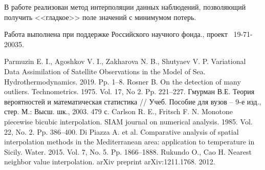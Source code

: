   

В работе реализован метод интерполяции данных наблюдений, позволяющий получить <<гладкое>> поле значений с минимумом потерь.
 
Работа выполнена при поддержке Российского научного фонда., проект \textnumero~19-71-20035.
 



\begin{thebibliography}{9} %
 Parmuzin  E. I., Agoshkov  V. I.,  Zakharova  N. B., Shutyaev  V. P. Variational Data Assimilation of Satellite Observations in the Model of Sea. Hydrothermodynamics. 2019. Pp. 1--8. 
 Rosner  B. On the detection of many outliers. Technometrics. 1975. Vol. 17, No 2. Pp. 221--227.
 Гмурман В.Е. Теория вероятностей и математическая статистика // Учеб. Пособие для вузов – 9-е изд., стер. М.: Высш. шк., 2003. 479 с.
 Carlson R. E., Fritsch F. N. Monotone piecewise bicubic interpolation. SIAM journal on numerical analysis.  1985.  Vol. 22, No. 2. Pp. 386--400.
 Di Piazza A. et al. Comparative analysis of spatial interpolation methods in the Mediterranean area: application to temperature in Sicily. Water.  2015.  Vol. 7, No. 5.  Pp. 1866--1888.
 Rukundo O., Cao H. Nearest neighbor value interpolation. arXiv preprint arXiv:1211.1768.  2012.
\end{thebibliography}





%

